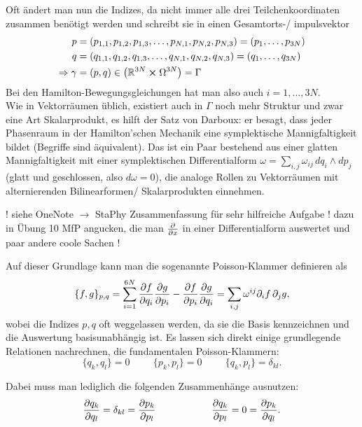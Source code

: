 Oft ändert man nun die Indizes, da nicht immer alle drei Teilchenkoordinaten zusammen benötigt werden und schreibt sie in einen Gesamtorts-/ impulsvektor
\begin{align}\label{key}
p &= (p_{1,1}, p_{1,2}, p_{1,3}, \dots, p_{N,1}, p_{N,2}, p_{N,3}) = (p_1, \dots, p_{3N})
\\
q &= (q_{1,1}, q_{1,2}, q_{1,3}, \dots, q_{N,1}, q_{N,2}, q_{N,3}) = (q_1, \dots, q_{3N})
\\
\Rightarrow \gamma &= (p, q) \in \qty(\mathbb{R}^{3N} \cross \Omega^{3N}) = \Gamma
\end{align}
Bei den Hamilton-Bewegungsgleichungen hat man also auch $i = 1, \dots, 3N$.\\

Wie in Vektorräumen üblich, existiert auch in $\Gamma$ noch mehr Struktur und zwar eine Art Skalarprodukt, es hilft der Satz von Darboux: er besagt, dass jeder Phasenraum in der Hamilton'schen Mechanik eine symplektische Mannigfaltigkeit bildet (Begriffe sind äquivalent). Das ist ein Paar bestehend aus einer glatten Mannigfaltigkeit mit einer symplektischen Differentialform $\omega = \sum\limits_{i,j} \omega_{ij} \, dq_i \wedge dp_j$ (glatt und geschlossen, also $d\omega = 0$), die analoge Rollen zu Vektorräumen mit alternierenden Bilinearformen/ Skalarprodukten einnehmen.

! siehe OneNote $\rightarrow$ StaPhy Zusammenfassung für sehr hilfreiche Aufgabe ! dazu in Übung 10 MfP angucken, die man $\pdv{x}$ in einer Differentialform auswertet und paar andere coole Sachen !

Auf dieser Grundlage kann man die sogenannte Poisson-Klammer definieren als
\begin{equation}\label{key}
\{f,g\}_{p,q} = \sum\limits_{i = 1}^{6N} \pdv{f}{q_i} \pdv{g}{p_i} - \pdv{f}{p_i} \pdv{g}{q_i} = \sum\limits_{i,j} \omega^{ij} \partial_i f \, \partial_j g ,
\end{equation}
wobei die Indizes $p,q$ oft weggelassen werden, da sie die Basis kennzeichnen und die Auswertung basisunabhängig ist. Es lassen sich direkt einige grundlegende Relationen nachrechnen, die fundamentalen Poisson-Klammern:
\begin{equation}\label{key}
\{q_k, q_l\} = 0 \hspace{1cm} \{p_k, p_l\} = 0 \hspace{1cm} \{q_k, p_l\} = \delta_{kl} .
\end{equation}

Dabei muss man lediglich die folgenden Zusammenhänge ausnutzen:
\begin{equation}\label{key}
\pdv{q_k}{q_l} = \delta_{kl} = \pdv{p_k}{p_l} \hspace{2cm} \pdv{q_k}{p_l} = 0 = \pdv{p_k}{q_l} .
\end{equation}

